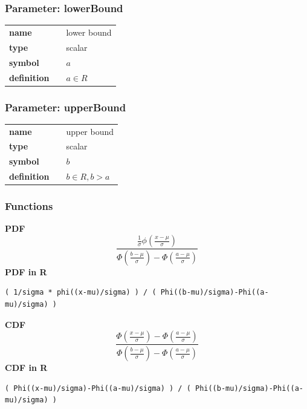 \subsubsection*{Parameter: lowerBound}

\noindent\begin{tabular}{p{2cm}cl}
\textbf{name} & & lower bound \\
\textbf{type} & & scalar \\
\textbf{symbol} & & $a$  \\
\textbf{definition} & & $a \in R$
\end{tabular}
\subsubsection*{Parameter: upperBound}

\noindent\begin{tabular}{p{2cm}cl}
\textbf{name} & & upper bound \\
\textbf{type} & & scalar \\
\textbf{symbol} & & $b$  \\
\textbf{definition} & & $b \in R, b > a$
\end{tabular}
\subsubsection*{Functions}

\smallskip \noindent \hspace{.2cm} \textbf{PDF} 
\begin{equation*}\frac{\frac{1}{\sigma} \phi(\frac{x-\mu}{\sigma})}{\Phi(\frac{b-\mu}{\sigma})-\Phi(\frac{a-\mu}{\sigma})}\end{equation*}
\smallskip \noindent \hspace{.2cm} \textbf{PDF in R}  
\begin{verbatim}( 1/sigma * phi((x-mu)/sigma) ) / ( Phi((b-mu)/sigma)-Phi((a-mu)/sigma) )\end{verbatim}
\smallskip \noindent \hspace{.2cm} \textbf{CDF} 
\begin{equation*}\frac{\Phi(\frac{x-\mu}{\sigma})-\Phi(\frac{a-\mu}{\sigma})}{\Phi(\frac{b-\mu}{\sigma})-\Phi(\frac{a-\mu}{\sigma})}\end{equation*}
\smallskip \noindent \hspace{.2cm} \textbf{CDF in R} 
\begin{verbatim}( Phi((x-mu)/sigma)-Phi((a-mu)/sigma) ) / ( Phi((b-mu)/sigma)-Phi((a-mu)/sigma) )\end{verbatim}
\smallskip
